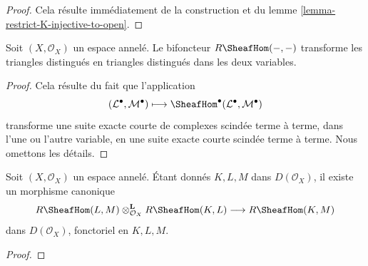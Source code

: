 {\begin{proof}
Cela résulte immédiatement de la construction et du lemme \ref{lemma-restrict-K-injective-to-open}.
\end{proof}

\begin{lemma}

\label{lemma-RHom-triangulated}

Soit $(X, \mathcal{O}_X)$ un espace annelé. Le bifoncteur $R\SheafHom(- , -)$
transforme les triangles distingués en triangles distingués dans les deux variables.

\end{lemma}

\begin{proof}

Cela résulte du fait que l'application
$$
(\mathcal{L}^\bullet, \mathcal{M}^\bullet) \longmapsto
\SheafHom^\bullet(\mathcal{L}^\bullet, \mathcal{M}^\bullet)
$$
transforme une suite exacte courte de complexes scindée terme à terme, dans l'une ou l'autre variable, en une suite exacte courte scindée terme à terme. Nous omettons les détails.

\end{proof}

\begin{lemma}

\label{lemma-internal-hom-composition}
Soit $(X, \mathcal{O}_X)$ un espace annelé. Étant donnés $K, L, M$ dans $D(\mathcal{O}_X)$, il existe un morphisme canonique $$
R\SheafHom(L, M) \otimes_{\mathcal{O}_X}^\mathbf{L} R\SheafHom(K, L)
\longrightarrow R\SheafHom(K, M)
$$ dans $D(\mathcal{O}_X)$, fonctoriel en $K, L, M$.
\end{lemma}

\begin{proof}


\end{proof}}
